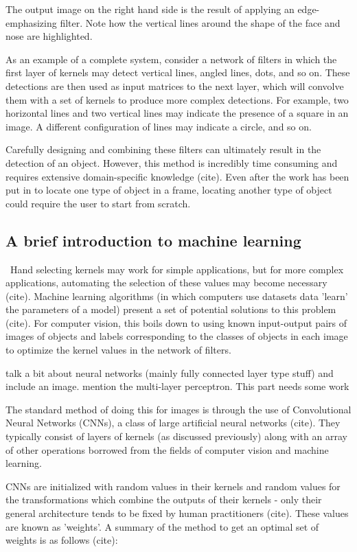 The output image on the right hand side is the result of applying an edge-emphasizing filter. Note how the vertical lines around the shape of the face and nose are highlighted.

As an example of a complete system, consider a network of filters in which the first layer of kernels may detect vertical lines, angled lines, dots, and so on. These detections are then used as input matrices to the next layer, which will convolve them with a set of kernels to produce more complex detections. For example, two horizontal lines and two vertical lines may indicate the presence of a square in an image. A different configuration of lines may indicate a circle, and so on.

Carefully designing and combining these filters can ultimately result in the detection of an object. However, this method is incredibly time consuming and requires extensive domain-specific knowledge {\color{red} (cite)}. Even after the work has been put in to locate one type of object in a frame, locating another type of object could require the user to start from scratch.

\subsection{A brief introduction to machine learning}\
Hand selecting kernels may work for simple applications, but for more complex applications, automating the selection of these values may become necessary {\color{red} (cite)}. Machine learning algorithms (in which computers use datasets data 'learn' the parameters of a model) present a set of potential solutions to this problem {\color{red} (cite)}. For computer vision, this boils down to using known input-output pairs of images of objects and labels corresponding to the classes of objects in each image to optimize the kernel values in the network of filters.

{\color{red} talk a bit about neural networks (mainly fully connected layer type stuff) and include an image. mention the multi-layer perceptron. This part needs some work}

The standard method of doing this for images is through the use of Convolutional Neural Networks (CNNs), a class of large artificial neural networks {\color{red} (cite)}. They typically consist of layers of kernels (as discussed previously) along with an array of other operations borrowed from the fields of computer vision and machine learning.

CNNs are initialized with random values in their kernels and random values for the transformations which combine the outputs of their kernels - only their general architecture tends to be fixed by human practitioners {\color{red} (cite)}. These values are known as 'weights'. A summary of the method to get an optimal set of weights is as follows {\color{red} (cite)}:

